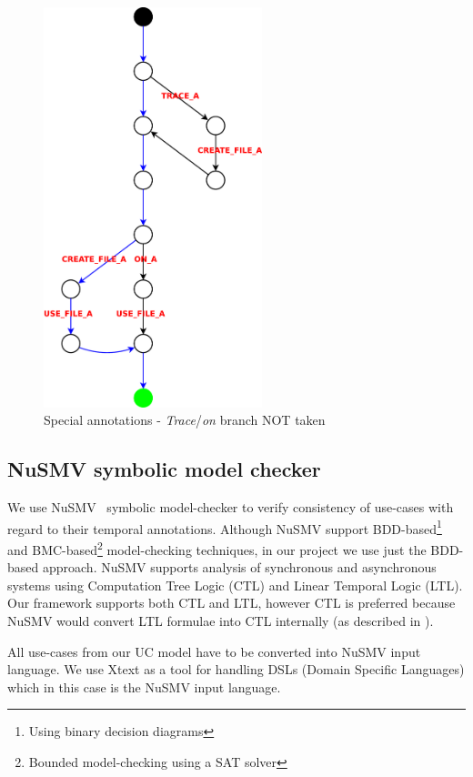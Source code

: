 \begin{figure}[ht]
  \centering
  \includegraphics[width=180pt]{images/traceTest_path_not_taken}
  \caption{Special annotations - \emph{Trace}/\emph{on} branch NOT taken}
  \label{fig:traceTestNotTaken}
\end{figure}

\subsection{NuSMV symbolic model checker}

We use NuSMV~\cite{NuSMV-CAV02,NuSMV-frocos02} symbolic model-checker to verify consistency of use-cases with regard to their temporal annotations.
Although NuSMV support BDD-based\footnote{Using binary decision diagrams} and BMC-based\footnote{Bounded model-checking using a SAT solver} model-checking techniques, in our project we use just the BDD-based approach.
NuSMV supports analysis of synchronous and asynchronous systems using Computation Tree Logic (CTL) and Linear Temporal Logic (LTL).
Our framework supports both CTL and LTL, however CTL is preferred because NuSMV would convert LTL formulae into CTL internally (as described in \cite{NuSMV-ltl-fmsd97}).

All use-cases from our UC model have to be converted into NuSMV input language.
We use Xtext\cite{Xtext-website} as a tool for handling DSLs (Domain Specific Languages) which in this case is the NuSMV input language.

